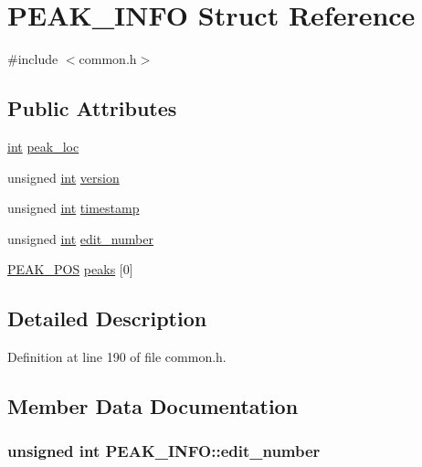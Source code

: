 \hypertarget{struct_p_e_a_k___i_n_f_o}{}\section{P\+E\+A\+K\+\_\+\+I\+N\+FO Struct Reference}
\label{struct_p_e_a_k___i_n_f_o}


{\ttfamily \#include $<$common.\+h$>$}

\subsection*{Public Attributes}
\begin{DoxyCompactItemize}
\item 
\hyperlink{xmltok_8h_a5a0d4a5641ce434f1d23533f2b2e6653}{int} \hyperlink{struct_p_e_a_k___i_n_f_o_acf3d1e8f36f0547534f7424142f16759}{peak\+\_\+loc}
\item 
unsigned \hyperlink{xmltok_8h_a5a0d4a5641ce434f1d23533f2b2e6653}{int} \hyperlink{struct_p_e_a_k___i_n_f_o_a541af59eb790d3e0e91fecb9f7be753a}{version}
\item 
unsigned \hyperlink{xmltok_8h_a5a0d4a5641ce434f1d23533f2b2e6653}{int} \hyperlink{struct_p_e_a_k___i_n_f_o_ace12bab485583fd1d10fb6eb6ed42324}{timestamp}
\item 
unsigned \hyperlink{xmltok_8h_a5a0d4a5641ce434f1d23533f2b2e6653}{int} \hyperlink{struct_p_e_a_k___i_n_f_o_a3c802a546942481f378b702b29312e7e}{edit\+\_\+number}
\item 
\hyperlink{struct_p_e_a_k___p_o_s}{P\+E\+A\+K\+\_\+\+P\+OS} \hyperlink{struct_p_e_a_k___i_n_f_o_ac2da4c4fd001aea42bb50b493b8a6e7e}{peaks} \mbox{[}0\mbox{]}
\end{DoxyCompactItemize}


\subsection{Detailed Description}


Definition at line 190 of file common.\+h.



\subsection{Member Data Documentation}
\subsubsection[{\texorpdfstring{edit\+\_\+number}{edit_number}}]{\setlength{\rightskip}{0pt plus 5cm}unsigned {\bf int} P\+E\+A\+K\+\_\+\+I\+N\+F\+O\+::edit\+\_\+number}\hypertarget{struct_p_e_a_k___i_n_f_o_a3c802a546942481f378b702b29312e7e}{}\label{struct_p_e_a_k___i_n_f_o_a3c802a546942481f378b702b29312e7e}


